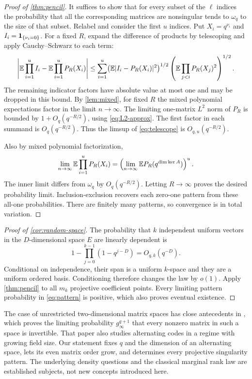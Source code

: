 \begin{proof}[Proof of \cref{thm:pencil}]
It suffices to show that for every subset of the $\ell$ indices the
probability that all the corresponding matrices are nonsingular tends to
$\omega_q$ to the size of that subset. Relabel and consider the first $u$
indices. Put $X_i=q^{\nu_i}$ and $I_i=\mathbf 1_{\{\nu_i=0\}}$.
For a fixed $R$, expand the difference of products by telescoping and apply
Cauchy--Schwarz to each term:
\begin{align}
 \left|\mathbb E\prod_{i=1}^u I_i-\mathbb E\prod_{i=1}^uP_R(X_i)\right|
 \le\sum_{i=1}^u
 \bigl(\mathbb E|I_i-P_R(X_i)|^2\bigr)^{1/2}
 \left(\mathbb E\prod_{j<i}P_R(X_j)^2\right)^{1/2}.
 \label{eq:telescope}
\end{align}
The remaining indicator factors have absolute value at most one and may be
dropped in this bound. By \cref{lem:mixed}, for fixed $R$ the mixed
polynomial expectations factor in the limit $n\to\infty$. The limiting
one-matrix $L^2$ norm of $P_R$ is bounded by $1+O_q(q^{-R/2})$, using
\eqref{eq:L2-approx}. The first factor in each summand is
$O_q(q^{-R/2})$. Thus the limsup of \eqref{eq:telescope} is
$O_{q,u}(q^{-R/2})$.

Also by mixed polynomial factorization,
\[
 \lim_{n\to\infty}\mathbb E\prod_{i=1}^uP_R(X_i)
 =\left(\lim_{n\to\infty}\mathbb E P_R(q^{\dim\ker A})\right)^u.
\]
The inner limit differs from $\omega_q$ by $O_q(q^{-R/2})$.
Letting $R\to\infty$ proves the desired probability limit.
Inclusion-exclusion recovers each zero-one pattern from these all-one
probabilities. There are finitely many patterns, so convergence is in total
variation.
\end{proof}

\begin{proof}[Proof of \cref{cor:random-space}]
The probability that $k$ independent uniform vectors in the
$D$-dimensional space $E$ are linearly dependent is
\[
 1-\prod_{j=0}^{k-1}(1-q^{j-D})=O_{q,k}(q^{-D}).
\]
Conditional on independence, their span is a uniform $k$-space and they
are a uniform ordered basis. Conditioning therefore changes the law by
$o(1)$. Apply \cref{thm:pencil} to all $m_k$ projective coefficient
points. Every limiting pattern probability in \eqref{eq:pattern} is positive,
which also proves eventual existence.
\end{proof}

\begin{remark}
The case of unrestricted two-dimensional matrix spaces has close antecedents
in \cite[Section 6]{gruica}, which proves the limiting probability
$g_\infty^{q+1}$ that every nonzero matrix in such a space is invertible.
That paper also studies alternating codes in a regime with growing field
size. Our statement fixes $q$ and the dimension of an alternating space,
lets its even matrix order grow, and determines every projective singularity
pattern. The underlying density questions and the classical marginal rank
law are established subjects, not new concepts introduced here.
\end{remark}
